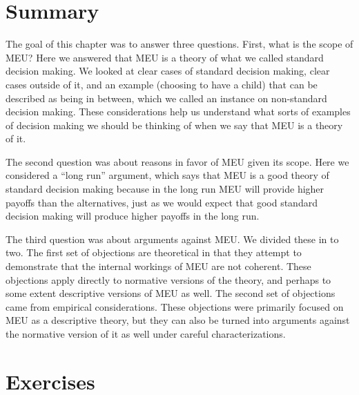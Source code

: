 \documentclass[]{tufte-book}
\begin{document}
\hypertarget{summary-1}{%
\section{Summary}\label{summary-1}}

The goal of this chapter was to answer three questions. First, what is the scope of MEU? Here we answered that MEU is a theory of what we called standard decision making. We looked at clear cases of standard decision making, clear cases outside of it, and an example (choosing to have a child) that can be described as being in between, which we called an instance on non-standard decision making. These considerations help us understand what sorts of examples of decision making we should be thinking of when we say that MEU is a theory of it.

The second question was about reasons in favor of MEU given its scope. Here we considered a ``long run'' argument, which says that MEU is a good theory of standard decision making because in the long run MEU will provide higher payoffs than the alternatives, just as we would expect that good standard decision making will produce higher payoffs in the long run.

The third question was about arguments against MEU. We divided these in to two. The first set of objections are theoretical in that they attempt to demonstrate that the internal workings of MEU are not coherent. These objections apply directly to normative versions of the theory, and perhaps to some extent descriptive versions of MEU as well. The second set of objections came from empirical considerations. These objections were primarily focused on MEU as a descriptive theory, but they can also be turned into arguments against the normative version of it as well under careful characterizations.

\hypertarget{exercises-5}{%
\section{Exercises}\label{exercises-5}}
\end{document}
